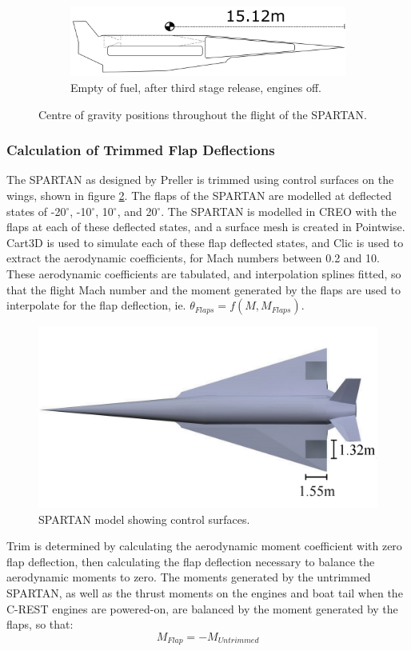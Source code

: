 \begin{figure}
\begin{subfigure}{.5\textwidth}
			\end{subfigure}
			\begin{subfigure}{.5\textwidth}
				\centering
				\includegraphics[width=0.9\linewidth]{figures/3_vehicle_design/CG5}
				\caption{Empty of fuel, after third stage release, engines off.}
				
			\end{subfigure}
			\caption{Centre of gravity positions throughout the flight of the SPARTAN.}
			\label{fig:CentreOfGravity}
		\end{figure}
		
		
		\subsubsection{Calculation of Trimmed Flap Deflections}\label{sec:trim}
		
		The SPARTAN as designed by Preller\cite{Preller2017b} is trimmed using control surfaces on the wings, shown in figure \ref{fig:SPARTAN_FLAPS}. 
		The flaps of the SPARTAN are modelled at deflected states of -20$^\circ$, -10$^\circ$, 10$^\circ$, and 20$^\circ$. The SPARTAN is modelled in CREO with the flaps at each of these deflected states, and a surface mesh is created in Pointwise. 
		Cart3D is used to simulate each of these flap deflected states, and Clic is used to extract the aerodynamic coefficients, for Mach numbers between 0.2 and 10. These aerodynamic coefficients are tabulated, and interpolation splines fitted, so that the flight Mach number and the moment generated by the flaps are used to interpolate for the flap deflection, ie. $\theta_{Flaps} = f(M,M_{Flaps})$.
		\begin{figure}[ht]
			\centering
			\includegraphics[width=0.6\linewidth]{figures/3_vehicle_design/SPARTAN_FLAPS}
			\caption{SPARTAN model showing control surfaces.}
			\label{fig:SPARTAN_FLAPS}
		\end{figure}
		Trim is determined by calculating the aerodynamic moment coefficient with zero flap deflection, then calculating the flap deflection necessary to balance the aerodynamic moments to zero. The moments generated by the untrimmed SPARTAN, as well as the thrust moments on the engines and boat tail when the C-REST engines are powered-on, are balanced by the moment generated by the flaps, so that:
		\begin{equation}
		M_{Flap} = -M_{Untrimmed}
		\end{equation}
		  
